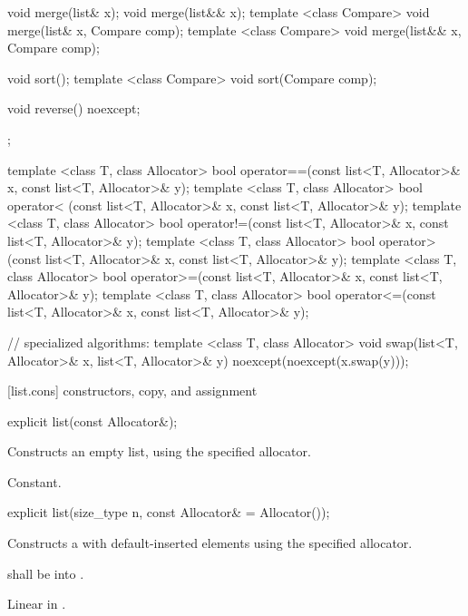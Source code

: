\begin{codeblock}
{{    void merge(list& x);
    void merge(list&& x);
    template <class Compare> void merge(list& x, Compare comp);
    template <class Compare> void merge(list&& x, Compare comp);

    void sort();
    template <class Compare> void sort(Compare comp);

    void reverse() noexcept;
  };

  template <class T, class Allocator>
    bool operator==(const list<T, Allocator>& x, const list<T, Allocator>& y);
  template <class T, class Allocator>
    bool operator< (const list<T, Allocator>& x, const list<T, Allocator>& y);
  template <class T, class Allocator>
    bool operator!=(const list<T, Allocator>& x, const list<T, Allocator>& y);
  template <class T, class Allocator>
    bool operator> (const list<T, Allocator>& x, const list<T, Allocator>& y);
  template <class T, class Allocator>
    bool operator>=(const list<T, Allocator>& x, const list<T, Allocator>& y);
  template <class T, class Allocator>
    bool operator<=(const list<T, Allocator>& x, const list<T, Allocator>& y);

  // specialized algorithms:
  template <class T, class Allocator>
    void swap(list<T, Allocator>& x, list<T, Allocator>& y)
      noexcept(noexcept(x.swap(y)));
}
\end{codeblock}

[list.cons]{ constructors, copy, and assignment}

%
%
\begin{itemdecl}
explicit list(const Allocator&);
\end{itemdecl}

\begin{itemdescr}
\pnum
\effects
Constructs an empty list, using the specified allocator.

\pnum
\complexity
Constant.
\end{itemdescr}

%
%
\begin{itemdecl}
explicit list(size_type n, const Allocator& = Allocator());
\end{itemdecl}

\begin{itemdescr}
\pnum
\effects Constructs a  with
 default-inserted elements using the specified allocator.

\pnum
\requires {} shall be  into .

\pnum
\complexity
Linear in
.
\end{itemdescr}

